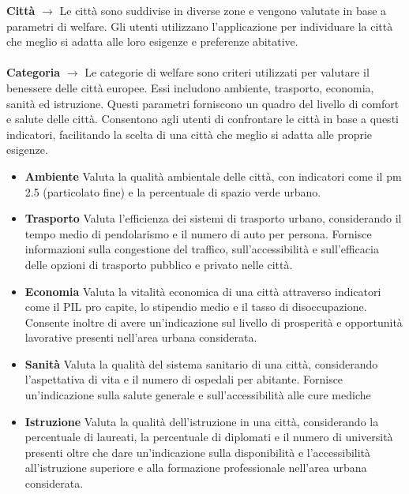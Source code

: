 \documentclass[a4paper,12pt]{report}
\begin{document}
        {\Large \textbf{Città}} $\rightarrow$ Le città sono suddivise in diverse zone e vengono valutate in base a parametri di welfare. Gli utenti utilizzano l'applicazione per individuare la città che meglio si adatta alle loro esigenze e preferenze abitative. \\
        \\
        {\Large \textbf{Categoria}} $\rightarrow$ Le categorie di welfare sono criteri utilizzati per valutare il benessere delle città europee. Essi includono ambiente, trasporto, economia, sanità ed istruzione. Questi parametri forniscono un quadro del livello di comfort e salute delle città. Consentono agli utenti di confrontare le città in base a questi indicatori, facilitando la scelta di una città che meglio si adatta alle proprie esigenze.
            \begin{itemize}
                \item \textbf{Ambiente}
                            Valuta la qualità ambientale delle città, con indicatori come il pm 2.5 (particolato fine) e la percentuale di spazio verde urbano.
                \item \textbf{Trasporto} 
                            Valuta l'efficienza dei sistemi di trasporto urbano, considerando il tempo medio di pendolarismo e il numero di auto per persona. Fornisce informazioni sulla congestione del traffico, sull'accessibilità e sull'efficacia delle opzioni di trasporto pubblico e privato nelle città.
                \item \textbf{Economia} 
                            Valuta la vitalità economica di una città attraverso indicatori come il PIL pro capite, lo stipendio medio e il tasso di disoccupazione. Consente inoltre di avere un'indicazione sul livello di prosperità e opportunità lavorative presenti nell'area urbana considerata.
                \item \textbf{Sanità}
                            Valuta la qualità del sistema sanitario di una città, considerando l'aspettativa di vita e il numero di ospedali per abitante. Fornisce un'indicazione sulla salute generale e sull'accessibilità alle cure mediche
                \item \textbf{Istruzione} 
                            Valuta la qualità dell'istruzione in una città, considerando la percentuale di laureati, la percentuale di diplomati e il numero di università presenti oltre che dare un'indicazione sulla disponibilità e l'accessibilità all'istruzione superiore e alla formazione professionale nell'area urbana considerata.
                \end{itemize} 
\end{document}
